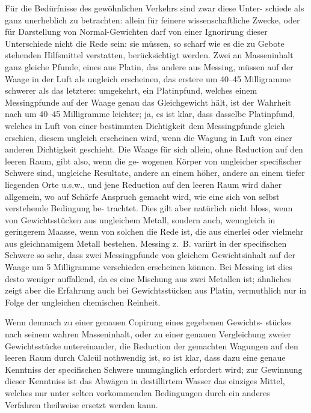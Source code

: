 \documentclass[12pt,a4paper]{article}
\theoremstyle{plain}
\theoremstyle{definition}
\theoremstyle{remark}
\begin{document}
F\"ur die Bed\"urfnisse des gew\"ohnlichen Verkehrs sind zwar diese Unter-
schiede als ganz unerheblich zu betrachten: allein f\"ur feinere wissenschaftliche
Zwecke, oder f\"ur Darstellung von Normal-Gewichten darf von einer Ignorirung
dieser Unterschiede nicht die Rede sein: sie m\"ussen, so scharf wie es die zu
Gebote stehenden Hilfsmittel verstatten, ber\"ucksichtigt werden. Zwei an
Masseninhalt ganz gleiche Pfunde, eines aus Platin, das andere aus Messing,
m\"ussen auf der Waage in der Luft als ungleich erscheinen, das erstere um
40--45 Milligramme schwerer als das letztere: umgekehrt, ein Platinpfund,
welches einem Messingpfunde auf der Waage genau das Gleichgewicht h\"alt,
ist der Wahrheit nach um 40--45 Milligramme leichter; ja, es ist klar, dass
dasselbe Platinpfund, welches in Luft von einer bestimmten Dichtigkeit dem
Messingpfunde gleich erschien, diesem ungleich erscheinen wird, wenn die
Wagung in Luft von einer anderen Dichtigkeit geschieht. Die Waage f\"ur
sich allein, ohne Reduction auf den leeren Raum, gibt also, wenn die ge-
wogenen K\"orper von ungleicher specifischer Schwere sind, ungleiche Resultate,
andere an einem h\"oher, andere an einem tiefer liegenden Orte u.s.w., und
jene Reduction auf den leeren Raum wird daher allgemein, wo auf Sch\"arfe
Anspruch gemacht wird, wie eine sich von selbst verstehende Bedingung be-
trachtet. Dies gilt aber nat\"urlich nicht bloss, wenn von Gewichtsst\"ucken aus
ungleichem Metall, sondern auch, wenngleich in geringerem Maasse, wenn von
solchen die Rede ist, die aus einerlei oder vielmehr aus gleichnamigem Metall
bestehen. Messing z.~B. variirt in der specifischen Schwere so sehr, dass zwei
Messingpfunde von gleichem Gewichtsinhalt auf der Waage um 5 Milligramme
verschieden erscheinen k\"onnen. Bei Messing ist dies desto weniger auffallend,
da es eine Mischung aus zwei Metallen ist; \"ahnliches zeigt aber die Erfahrung
auch bei Gewichtsst\"ucken aus Platin, vermuthlich nur in Folge der ungleichen
chemischen Reinheit.

Wenn demnach zu einer genauen Copirung eines gegebenen Gewichts-
st\"uckes nach seinem wahren Masseninhalt, oder zu einer genauen Vergleichung
zweier Gewichtsst\"ucke untereinander, die Reduction der gemachten Wagungen
auf den leeren Raum durch Calc\"ul nothwendig ist, so ist klar, dass dazu
eine genaue Kenntniss der specifischen Schwere unumg\"anglich erfordert wird;
zur Gewinnung dieser Kenntniss ist das Abw\"agen in destillirtem Wasser das
einziges Mittel, welches nur unter selten vorkommenden Bedingungen durch
ein anderes Verfahren theilweise ersetzt werden kann.
\end{document}
